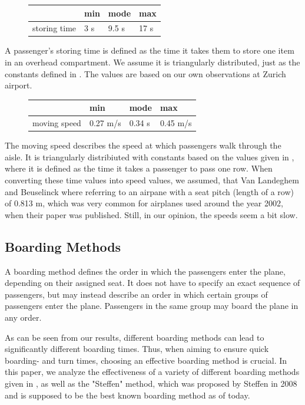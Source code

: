 \documentclass[11pt]{article}
\begin{document}
\begin{figure}[h!]
\begin{tabular}{l|l l l}

	&min &mode&max \\
	\hline
storing time & 3 s &9.5 s & 17 s \\
	\hline

	\end{tabular}
\end{figure}

A passenger's storing time is defined as the time it takes them to store one item in an overhead compartment. We assume it is triangularly distributed, just as the constants defined in \cite{beus}. The values are based on our own observations at Zurich airport.

\begin{figure}[h!]
\begin{tabular}{l|l l l}

	&min &mode&max \\
	\hline
moving speed &0.27 m/s&0.34 s& 0.45 m/s   \\
	\hline
\end{tabular}
\end{figure}
The moving speed describes the speed at which passengers walk through the aisle. It is triangularly distribiuted with constants based on the values given in \cite{beus}, where it is defined as the time it takes a passenger to pass one row. When converting these time values into speed values, we assumed, that Van Landeghem and Beuselinck where referring to an airpane with a seat pitch (length of a row) of 0.813 m, which was very common for airplanes used around the year 2002, when their paper was published. Still, in our opinion, the speeds seem a bit slow.


\subsection{Boarding Methods}
A boarding method defines the order in which the passengers enter the plane, depending on their assigned seat. It does not have to specify an exact sequence of passengers, but may instead describe an order in which certain groups of passengers enter the plane. Passengers in the same group may board the plane in any order. 


As can be seen from our results, different boarding methods can lead to significantly different boarding times. Thus, when aiming to ensure quick boarding- and turn times, choosing an effective boarding method is crucial. In this paper, we analyze the effectiveness of a variety of different boarding methods given in \cite{beus}, as well as the "Steffen" method, which was proposed by Steffen \cite{steffen} in 2008 and is supposed to be the best known boarding method as of today.
\end{document}
